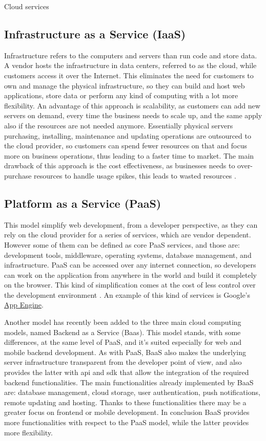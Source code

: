 \begin{chapter}{Cloud services}
    \subsection{Infrastructure as a Service (IaaS)}
    Infrastructure refers to the computers and servers than run code and store data.
    A vendor hosts the infrastructure in data centers, referred to as the cloud,
    while customers access it over the Internet. This eliminates the need for customers
    to own and manage the physical infrastructure, so they can build and host web
    applications, store data or perform any kind of computing with a lot more flexibility.
    An advantage of this approach is scalability, as customers can add new servers
    on demand, every time the business needs to scale up, and the same apply also
    if the resources are not needed anymore. Essentially physical servers purchasing,
    installing, maintenance and updating operations are outsourced to the cloud
    provider, so customers can spend fewer resources on that and focus more on business
    operations, thus leading to a faster time to market. The main drawback of this
    approach is the cost effectiveness, as businesses needs to over-purchase resources
    to handle usage spikes, this leads to wasted resources \cite{iaas}.

    \subsection{Platform as a Service (PaaS)}
    This model simplify web development, from a developer perspective, as they can
    rely on the cloud provider for a series of services, which are vendor dependent.
    However some of them can be defined as core PaaS services, and those are: development
    tools, middleware, operating systems, database management, and infrastructure.
    PaaS can be accessed over any internet connection, so developers can work on
    the application from anywhere in the world and build it completely on the browser.
    This kind of simplification comes at the cost of less control over the development
    environment \cite{paas}. An example of this kind of services is Google's
    \href{https://cloud.google.com/appengine}{App Engine}.

    \smallskip
    Another model has recently been added to the three main cloud computing models,
    named Backend as a Service (Baas). This model stands, with some differences,
    at the same level of PaaS, and it's suited especially for web and mobile backend
    development. As with PaaS, BaaS also makes the underlying server infrastructure
    transparent from the developer point of view, and also provides the latter with
    api and sdk that allow the integration of the required backend functionalities.
    The main functionalities already implemented by BaaS are: database management,
    cloud storage, user authentication, push notifications, remote updating and hosting.
    Thanks to these functionalities there may be a greater focus on frontend or mobile
    development.
    In conclusion BaaS provides more functionalities with respect to the PaaS model,
    while the latter provides more flexibility.


\end{chapter}
